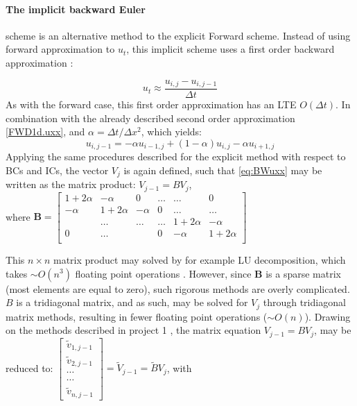 \documentclass[%
oneside,                 %
final,                   %
10pt]{article}
\begin{document}
\paragraph{The implicit backward Euler} scheme is an alternative method to the explicit Forward scheme. Instead of using forward  approximation to $u_{t}$, this implicit scheme uses a first order backward approximation \citep[308]{HJ15}:

\begin{equation}
u_{t} \approx \frac{u_{i,j}- u_{i,j-1}}{\Delta t} \label{BW.ut}
\end{equation}
As with the forward case, this first order approximation has an LTE $O(\Delta t)$. In combination with the already described second order approximation \eqref{FWD1d.uxx}, and $\alpha=\Delta t/\Delta  x^2$, which yields:
\begin{equation}
u_{i,j-1}=-\alpha u_{i-1,j}+(1-\alpha)u_{i,j}-\alpha u_{i+1,j} \label{eq:BWuxx}
\end{equation}
Applying the same procedures described for the explicit method with respect to BCs and ICs, the vector $V_{j}$ is again defined, such that \eqref{eq:BWuxx} may be written as the matrix product:
$V_{j-1}=BV_j$,\\
where
$\textbf{B}=  \begin{bmatrix}
                           1+2\alpha & -\alpha & 0 &\dots   & \dots &0 \\
                           -\alpha & 1+2\alpha  &  -\alpha &0 &\dots &\dots \\
                           & \dots   & \dots &\dots   &1+2\alpha & -\alpha \\
                      
                           0&\dots    &  & 0  &-\alpha & 1+2\alpha \\
              			\end{bmatrix}$ 


This $n \times n$ matrix product may solved by for example LU decomposition, which takes $\sim O(n^3)$ floating point operations \citep[173]{HJ15}. However, since \textbf{B} is a sparse matrix (most elements are equal to zero), such rigorous methods are overly complicated. $B$ is a tridiagonal matrix, and as such, may be solved for $V_j$ through tridiagonal matrix methods, resulting in fewer floating point operations ($\sim O(n)$). Drawing on the methods described in project 1 \cite{P1}, the matrix equation $V_{j-1}=BV_j$, may be reduced to: \newline
$\begin{bmatrix} \tilde{v}_{1,j-1} \\ \tilde{v}_{2,j-1}\\ \cdots \\ \cdots \\ \tilde{v}_{n,j-1}\end{bmatrix}=\tilde{V}_{j-1}=\tilde{B}V_j$, with
\end{document}
